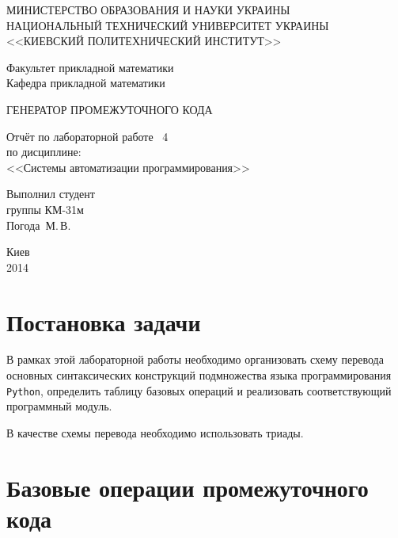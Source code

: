 \documentclass[a4paper,12pt,notitlepage,pdftex]{scrreprt}
\begin{document}
\begin{titlepage}
    \begin{center}
        \MakeUppercase{Министерство образования и науки Украины}\\
        \MakeUppercase{Национальный технический университет Украины}\\
        \MakeUppercase{<<Киевский политехнический институт>>}\\
        \vspace*{2em}

        Факультет прикладной математики\\
        Кафедра прикладной математики

        \vfill

        \MakeUppercase{Генератор промежуточного кода}\\
        \vspace*{2em}

        Отчёт по лабораторной работе \textnumero~4\\
        по дисциплине:\\
        <<Системы автоматизации программирования>>
    \end{center}

    \vfill
    \hfill\begin{minipage}{0.3\textwidth}
        Выполнил студент\\
        группы КМ-31м\\
        Погода~М.\,В.
    \end{minipage}

    \vfill
    \begin{center}
        Киев\\
        2014
    \end{center}
\end{titlepage}

\tableofcontents

\chapter{Постановка задачи}\label{chap:first}
    В рамках этой лабораторной работы необходимо организовать схему перевода основных синтаксических конструкций
    подмножества языка программирования \texttt{Python}, определить таблицу базовых операций и реализовать
    соответствующий программный модуль.

    В качестве схемы перевода необходимо использовать триады.
\chapter{Базовые операции промежуточного кода}\label{chap:second}
\end{document}
